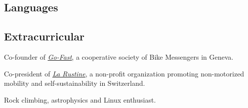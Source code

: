 \documentclass[]{plushcv}
\begin{document}
\begin{minipage}[t]{0.25\textwidth} 
\sectionsep
\sectionsep
\sectionsep
\sectionsep
\sectionsep
\sectionsep
\sectionsep
\sectionsep

\subsection{Languages}
\sectionsep
\runsubsection{}


\sectionsep
\runsubsection{}
\sectionsep
\sectionsep
\sectionsep


\subsection{Extracurricular} 
\sectionsep
\sectionsep
\sectionsep
\begin{tightemize}
\item Co-founder of \href{http://www.go-fast.ch/}{\underline{\textit{Go-Fast}}}, a cooperative society of Bike Messengers in Geneva.
\item Co-president of \href{http://www.larustine.bike/}{\underline{\textit{La Rustine}}}, a non-profit organization promoting non-motorized mobility and self-sustainability in Switzerland.
\item Rock climbing, astrophysics and Linux enthusiast.
\end{tightemize}


\end{minipage}
\end{document}
